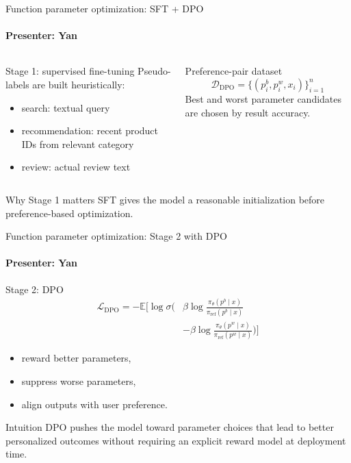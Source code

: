 \documentclass[10pt]{beamer}
\newcommand{\speaker}[1]{\framesubtitle{Presenter: #1}}
\begin{document}
\begin{frame}{Function parameter optimization: SFT + DPO}
  \speaker{Yan}
  \begin{columns}[T,onlytextwidth]
      \begin{block}{Stage 1: supervised fine-tuning}
        \small
        Pseudo-labels are built heuristically:
        \begin{itemize}\itemsep0.2em
          \item search: textual query
          \item recommendation: recent product IDs from relevant category
          \item review: actual review text
        \end{itemize}
      \end{block}
      \begin{block}{Preference-pair dataset}
        \small
        \[
          \mathcal{D}_{\mathrm{DPO}} = \{(p_i^{b}, p_i^{w}, x_i)\}_{i=1}^{n}
        \]
        Best and worst parameter candidates are chosen by result accuracy.
      \end{block}
  \end{columns}
  \begin{alertblock}{Why Stage 1 matters}
    \small SFT gives the model a reasonable initialization before preference-based optimization.
  \end{alertblock}
\end{frame}

\begin{frame}{Function parameter optimization: Stage 2 with DPO}
  \speaker{Yan}
  \begin{block}{Stage 2: DPO}
    \tiny
    \[
    \begin{aligned}
      \mathcal{L}_{\mathrm{DPO}} = -\mathbb{E}\Bigg[\log \sigma\Bigg(&\beta \log \frac{\pi_{\theta}(p^{b}\mid x)}{\pi_{\mathrm{ref}}(p^{b}\mid x)} \\
      &- \beta \log \frac{\pi_{\theta}(p^{w}\mid x)}{\pi_{\mathrm{ref}}(p^{w}\mid x)}\Bigg)\Bigg]
    \end{aligned}
    \]
    \vspace{-0.9em}
    {\small
    \begin{itemize}\itemsep0.25em
      \item reward better parameters,
      \item suppress worse parameters,
      \item align outputs with user preference.
    \end{itemize}
    }
  \end{block}
  \begin{block}{Intuition}
    \small DPO pushes the model toward parameter choices that lead to better personalized outcomes without requiring an explicit reward model at deployment time.
  \end{block}
\end{frame}
\end{document}
